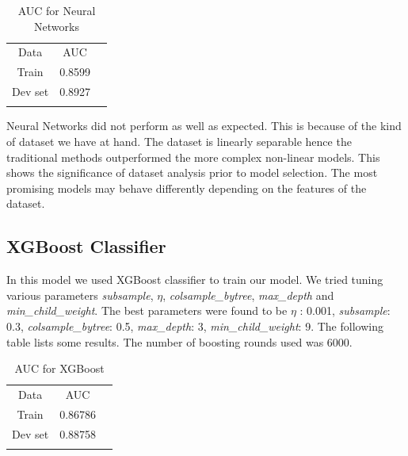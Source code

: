 \documentclass[conference]{IEEEtran}
\numberwithin{equation}{section}
\numberwithin{figure}{section}
\numberwithin{table}{section}
\begin{document}
\begin{table}[!htb]
 \centering
 \caption{AUC for Neural Networks}
 \label{tab_nn}
\begin{tabular}{ c c c } 
	    \noalign{\smallskip}\hline\noalign{\smallskip}
		Data &  AUC \\
    	   \noalign{\smallskip}\hline\noalign{\smallskip}
		Train &  0.8599\\
		Dev set &  0.8927\\
				\noalign{\smallskip}\hline\noalign{\smallskip}
  \end{tabular} 
\end{table}

Neural Networks did not perform as well as expected. This is because of the kind of dataset we have at hand. The dataset is linearly separable hence the traditional methods outperformed the more complex non-linear models. This shows the significance of dataset analysis prior to model selection. The most promising models may behave differently depending on the features of the dataset.  

\subsection{XGBoost Classifier}
In this model we used XGBoost classifier to train our model. We tried tuning various parameters \textit{subsample}, \textit{$\eta$}, \textit{colsample\_bytree}, \textit{max\_depth} and \textit{min\_child\_weight}. The best parameters were found to be \textit{$\eta$} : 0.001, \textit{subsample}: 0.3, \textit{colsample\_bytree}: 0.5, \textit{max\_depth}: 3, \textit{min\_child\_weight}: 9. The following table lists some results.  The number of boosting rounds used was 6000.
 
\begin{table}[!htb]
\centering
\caption{AUC for XGBoost}
\label{tab_xgb}
\begin{tabular}{ c c c }
                    \noalign{\smallskip}\hline\noalign{\smallskip}
                                Data  & AUC \\
                   \noalign{\smallskip}\hline\noalign{\smallskip}
                                Train & 0.86786\\
                                Dev set  & 0.88758\\  
                                		\noalign{\smallskip}\hline\noalign{\smallskip}	                   
  \end{tabular}
\end{table}
 
\end{document}
